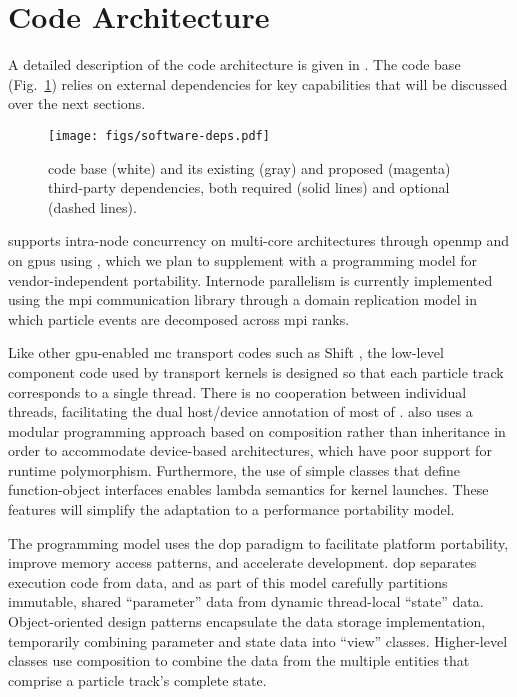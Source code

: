 \section{Code Architecture}

A detailed description of the \celeritas code architecture is given in
\textcite{johnson_2021}. The code base (Fig.~\ref{fig:celeritas-code-base})
relies on external dependencies for key capabilities that will be discussed over the next sections.
\begin{figure}
  \centering
  \texttt{[image: figs/software-deps.pdf]}
  \caption{\celeritas code base (white) and its existing (gray) and proposed
    (magenta) third-party dependencies, both required (solid lines) and optional
    (dashed lines).}
  \label{fig:celeritas-code-base}
\end{figure}

\celeritas supports intra-node concurrency on multi-core architectures through
\acs{openmp} and on \nvidia \acp{gpu} using \cuda, which we plan to supplement
with a programming model for vendor-independent portability.  Internode
parallelism is currently implemented using the \ac{mpi} communication library
through a domain replication model in which particle events are decomposed
across \ac{mpi} ranks.

Like other \ac{gpu}-enabled \ac{mc} transport codes such as Shift
\cite{pandya_implementation_2016,hamilton_multigroup_2018,
hamilton_continuous-energy_2019,hamilton_domain_2022}, the low-level component
code used by transport kernels is designed so that each particle track
corresponds to a single thread. There is no cooperation between individual
threads, facilitating the dual host/device annotation of most of \celeritas.
\celeritas also uses a modular programming approach based on composition rather
than inheritance in order to accommodate device-based architectures, which have
poor support for runtime polymorphism.  Furthermore, the use of simple classes
that define function-object interfaces enables lambda semantics for kernel
launches. These features will simplify the adaptation to a performance
portability model.

The \celeritas programming model uses the \ac{dop} paradigm \cite{dop_2022} to
facilitate platform portability, improve memory access patterns, and accelerate
development. \ac{dop} separates execution code from data, and as part of this
model \celeritas carefully partitions immutable, shared ``parameter'' data from
dynamic thread-local ``state'' data. Object-oriented design patterns encapsulate
the data storage implementation, temporarily combining parameter and state data
into ``view'' classes.  Higher-level classes use composition to combine the data
from the multiple entities that comprise a particle track's complete state.

